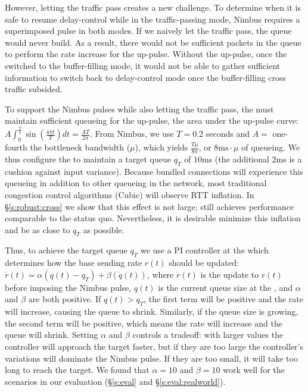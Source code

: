 However, letting the traffic pass creates a new challenge. 
To determine when it is safe to resume delay-control while in the traffic-passing mode, Nimbus requires a superimposed pulse in both modes. If we naively let the traffic pass, the \inbox queue would never build. As a result, there would not be sufficient packets in the queue to perform the rate increase for the up-pulse. 
Without the up-pulse, once the \inbox{} switched to the buffer-filling mode, it would not be able to gather sufficient information to switch back to delay-control mode once the buffer-filling cross traffic subsided.

To support the Nimbus pulses while also letting the traffic pass,
the \inbox must maintain sufficient queueing for the up-pulse,
\ie the area under the up-pulse curve: 
$A \int_0^{\frac{T}{4}} \sin(\frac{4\pi{}t}{T}) dt = \frac{AT}{2\pi}$.
From Nimbus, we use $T = 0.2$ seconds and $A =$ one-fourth the bottleneck bandwidth ($\mu$),
which yields
$\frac{T\mu}{8\pi}$, or $8\text{ms}\cdot \mu$ of queueing. 
We thus configure the \inbox to maintain a target queue $q_T$ of $10$ms (the additional $2$ms is a cushion against input variance).
Because bundled connections will experience this queueing in addition to other queueing in the network, 
most traditional congestion control algorithms (\eg Cubic) will observe RTT inflation. 
In \S\ref{s:robust:cross} we show that this effect is not large; \name still achieves performance comparable to the status quo. Nevertheless, it is desirable minimize this inflation and be as close to $q_T$ as possible. 

Thus, to achieve the target queue $q_T$
we use a PI controller at the \inbox which determines how the base sending rate $r(t)$ should be updated:
$\dot{r}(t) = \alpha (q(t) - q_T) + \beta (\dot{q}(t))$, where $\dot{r}(t)$ is the update to $r(t)$ before imposing the Nimbus pulse, $q(t)$ is the current queue size at the \inbox, and $\alpha$ and $\beta$ are both positive.
If $q(t) > q_T$, the first term will be positive and the rate will increase, causing the queue to shrink. Similarly, if the queue size is growing, the second term will be positive, which means the rate will increase and the queue will shrink. 
Setting $\alpha$ and $\beta$ controls a tradeoff: with larger values the controller will approach the target faster, but if they are too large the controller's variations will dominate the Nimbus pulse. 
If they are too small, it will take too long to reach the target. 
We found that $\alpha=10$ and $\beta = 10$ work well for the scenarios in our evaluation (\S\ref{s:eval} and \S\ref{s:eval:realworld}).

